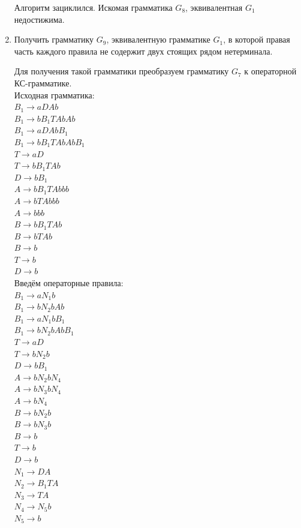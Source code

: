 \documentclass[a4paper,14pt]{extarticle}
\begin{document}
\begin{enumerate}[1.]
Алгоритм зациклился. Искомая грамматика $G_8$, эквивалентная $G_1$ недостижима.
\fi

\item Получить грамматику $G_9$, эквивалентную грамматике $G_1$, в которой
правая часть каждого правила не содержит двух стоящих рядом нетерминала.

Для получения такой грамматики преобразуем грамматику $G_7$ к операторной КС-грамматике.\\
Исходная грамматика:\\
$B_1 \rightarrow aDAb$\\
$B_1 \rightarrow bB_1TAbAb$\\
$B_1 \rightarrow aDAbB_1$\\
$B_1 \rightarrow bB_1TAbAbB_1$\\
$T \rightarrow aD$\\ 
$T \rightarrow bB_1TAb$\\
$D \rightarrow bB_1$\\
$A \rightarrow bB_1TAbbb$\\
$A \rightarrow bTAbbb$\\
$A \rightarrow bbb$\\
$B \rightarrow bB_1TAb$\\ 
$B \rightarrow bTAb$\\ 
$B \rightarrow b$\\
$T \rightarrow b$\\
$D \rightarrow b$\\

Введём операторные правила:\\
$B_1 \rightarrow aN_1b$\\
$B_1 \rightarrow bN_2bAb$\\
$B_1 \rightarrow aN_1bB_1$\\
$B_1 \rightarrow bN_2bAbB_1$\\
$T \rightarrow aD$\\ 
$T \rightarrow bN_2b$\\
$D \rightarrow bB_1$\\
$A \rightarrow bN_2bN_4$\\
$A \rightarrow bN_3bN_4$\\
$A \rightarrow bN_4$\\
$B \rightarrow bN_2b$\\ 
$B \rightarrow bN_3b$\\ 
$B \rightarrow b$\\
$T \rightarrow b$\\
$D \rightarrow b$\\
$N_1 \rightarrow DA$\\
$N_2 \rightarrow B_1TA$\\
$N_3 \rightarrow TA$\\
$N_4 \rightarrow N_5b$\\
$N_5 \rightarrow b$\\


\end{enumerate}
\end{document}
